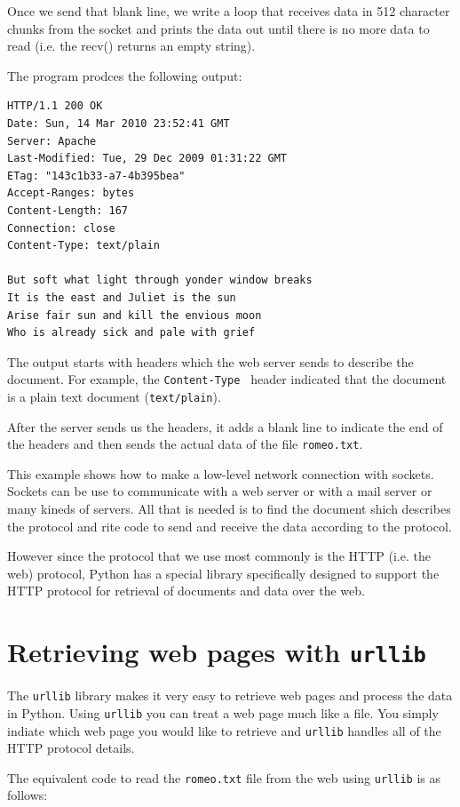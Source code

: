 Once we send that blank line, we write a loop that receives data 
in 512 character chunks from the socket and prints the data out 
until there is no more data to read (i.e. the recv() returns 
an empty string).

The program prodces the following output:

\beforeverb
\begin{verbatim}
HTTP/1.1 200 OK
Date: Sun, 14 Mar 2010 23:52:41 GMT
Server: Apache
Last-Modified: Tue, 29 Dec 2009 01:31:22 GMT
ETag: "143c1b33-a7-4b395bea"
Accept-Ranges: bytes
Content-Length: 167
Connection: close
Content-Type: text/plain

But soft what light through yonder window breaks
It is the east and Juliet is the sun
Arise fair sun and kill the envious moon
Who is already sick and pale with grief
\end{verbatim}
\afterverb
%
The output starts with headers which the web server sends
to describe the document.
For example, the {\tt Content-Type } header indicated that
the document is a plain text document ({\tt text/plain}).

After the server sends us the headers, it adds a blank line
to indicate the end of the headers and then sends the actual
data of the file {\tt romeo.txt}.

This example shows how to make a low-level network connection
with sockets.   Sockets can be use to communicate with a web
server or with a mail server or many kineds of servers.
All that is needed is to find the document shich describes
the protocol and rite code to send and receive the data
according to the protocol.

However since the protocol that we use most commonly is
the HTTP (i.e. the web) protocol, Python has a special 
library specifically designed to support the HTTP protocol 
for retrieval of
documents and data over the web.

\section{Retrieving web pages with {\tt urllib}}

The {\tt urllib} library makes it very easy to retrieve
web pages and process the data in Python.   Using {\tt urllib}
you can treat a web page much like a file.   You simply
indiate which web page you would like to retrieve and
{\tt urllib} handles all of the HTTP protocol details.

The equivalent code to read the {\tt romeo.txt} file
from the web using {\tt urllib} is as follows:


